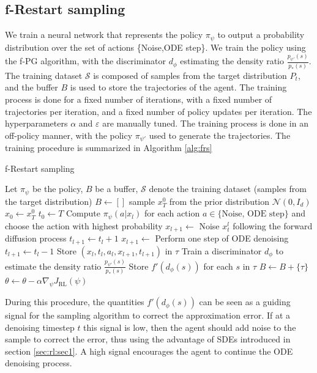 \subsection{f-Restart sampling}
We train a neural network that represents the policy $\pi_{\psi}$ to output a probability distribution over the set of actions \{Noise,ODE step\}. We train the policy using the f-PG algorithm, with the discriminator $d_{\phi}$ estimating the density ratio $\frac{p_{\psi'}(s)}{p_{*}(s)}$. The training dataset $\mathcal{S}$ is composed of samples from the target distribution $P_{t}$, and the buffer $B$ is used to store the trajectories of the agent. The training process is done for a fixed number of iterations, with a fixed number of trajectories per iteration, and a fixed number of policy updates per iteration. The hyperparameters $\alpha$ and $\varepsilon$ are manually tuned. The training process is done in an off-policy manner, with the policy $\pi_{\psi'}$ used to generate the trajectories. The training procedure is summarized in Algorithm \ref{alg:frs}

\begin{algorithm}
    \caption{f-Restart sampling}
    \label{alg:frs}
    \begin{algorithmic}[1]
    \State Let $\pi_\psi$ be the policy, $B$ be a buffer, $\mathcal{S}$ denote the training dataset (samples from the target distribution)
        \State $B \leftarrow []$
            \State sample $x_{T}^{0}$ from the prior distribution $\mathcal{N}(0,I_{d})$
            \State $x_{0} \leftarrow x_{T}^{0}$
            \State $t_{0} \leftarrow T$
            \State Compute $\pi_{\psi}(a|x_{l})$ for each action $a \in \{ \text{Noise, ODE step} \}$ and choose the action with highest probability
                \State $x_{l+1} \leftarrow  $ Noise $x_{t}^{l}$ following the forward diffusion process
                $t_{l+1} \leftarrow t_{l} + 1$
            \Else
                \State $x_{l+1} \leftarrow  $ Perform one step of ODE denoising
                $t_{l+1} \leftarrow t_{l} - 1$
            \EndIf
            \State Store $(x_{l},t_{l},a_{l},x_{l+1},t_{l+1})$ in $\tau$
            \EndFor
            \State Train a discriminator $d_{\phi}$ to estimate the density ratio $\frac{p_{\psi'}(s)}{p_{*}(s)}$
            \State Store $f' \left( d_{\phi}(s) \right)$ for each $s$ in $\tau$
            \State $B \leftarrow B + \{\tau \}$
        \EndFor
            \State $\theta \leftarrow \theta - \alpha \nabla_\psi J_{\mathrm{RL}}(\psi)$
        \EndFor
    \EndFor
    \end{algorithmic}
    \end{algorithm}
During this procedure, the quantities $f' \left( d_{\phi}(s) \right)$ can be seen as a guiding signal for the sampling algorithm to correct the approximation error. If at a denoising timestep $t$ this signal is low, then the agent should add noise to the sample to correct the error, thus using the advantage of SDEs introduced in section \ref*{sec:rl:sec1}. A high signal encourages the agent to continue the ODE denoising process.

